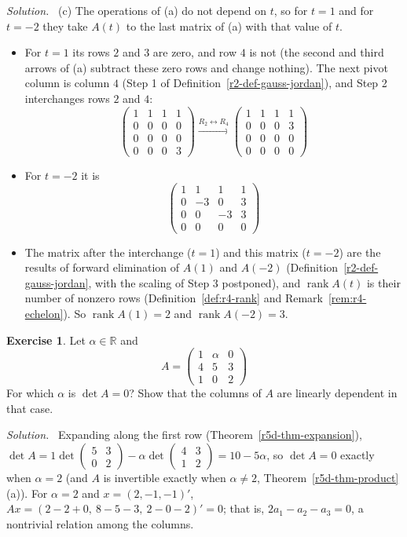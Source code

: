 \documentclass[12pt]{article}
\newcommand{\R}{\mathbb R}
\DeclareMathOperator{\rank}{rank}
\theoremstyle{definition}
\newtheorem{exercise}{Exercise}
\newenvironment{solution}{\par\noindent\textit{Solution.}\ }{\par\smallskip}
\begin{document}
\begin{solution}
(c) The operations of (a) do not depend on \(t\), so for \(t=1\) and for \(t=-2\) they take \(A(t)\) to the last
matrix of (a) with that value of \(t\).
\begin{itemize}
\item For \(t=1\) its rows \(2\) and \(3\) are zero, and row \(4\) is not (the second and third arrows of (a) subtract
these zero rows and change nothing). The next pivot column is column \(4\) (Step 1 of
Definition~\ref{r2-def-gauss-jordan}), and Step 2 interchanges rows \(2\) and \(4\):
\[
\begin{pmatrix}1&1&1&1\\0&0&0&0\\0&0&0&0\\0&0&0&3\end{pmatrix}
\xrightarrow{R_2\leftrightarrow R_4}
\begin{pmatrix}1&1&1&1\\0&0&0&3\\0&0&0&0\\0&0&0&0\end{pmatrix}
\]
\item For \(t=-2\) it is
\[
\begin{pmatrix}1&1&1&1\\0&-3&0&3\\0&0&-3&3\\0&0&0&0\end{pmatrix}
\]
\item The matrix after the interchange (\(t=1\)) and this matrix (\(t=-2\)) are the results of forward elimination of
\(A(1)\) and \(A(-2)\) (Definition~\ref{r2-def-gauss-jordan}, with the scaling of Step 3 postponed), and
\(\rank A(t)\) is their number of nonzero rows (Definition~\ref{def:r4-rank} and Remark~\ref{rem:r4-echelon}). So
\(\rank A(1)=2\) and \(\rank A(-2)=3\).
\end{itemize}
\end{solution}

\begin{exercise}\label{r5d-ex-alpha}
Let \(\alpha\in\R\) and
\[
A=\begin{pmatrix}1&\alpha&0\\4&5&3\\1&0&2\end{pmatrix}
\]
For which \(\alpha\) is \(\det A=0\)? Show that the columns of \(A\) are linearly dependent in that case.
\end{exercise}
\begin{solution}
Expanding along the first row (Theorem~\ref{r5d-thm-expansion}),
\(\det A=1\det\left(\begin{smallmatrix}5&3\\0&2\end{smallmatrix}\right)
-\alpha\det\left(\begin{smallmatrix}4&3\\1&2\end{smallmatrix}\right)=10-5\alpha\), so \(\det A=0\) exactly
when \(\alpha=2\) (and \(A\) is invertible exactly when \(\alpha\ne2\),
Theorem~\ref{r5d-thm-product}(a)). For \(\alpha=2\) and \(x=(2,-1,-1)'\),
\(Ax=(2-2+0,\ 8-5-3,\ 2-0-2)'=0\); that is, \(2a_1-a_2-a_3=0\), a nontrivial relation among the columns.
\end{solution}
\end{document}

